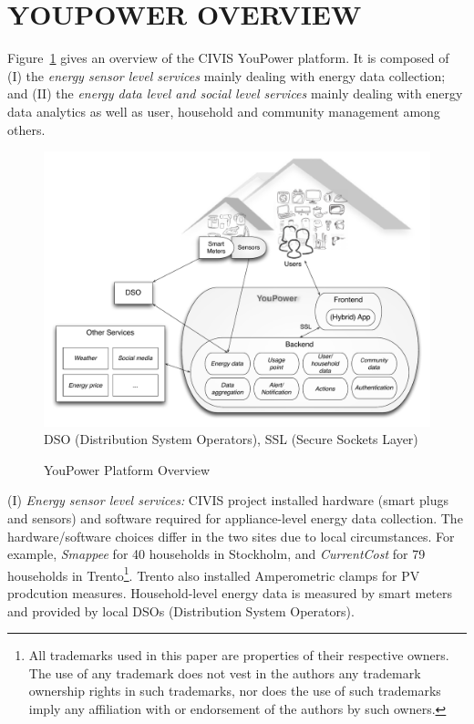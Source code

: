 
\section{\uppercase{YouPower Overview}}
\label{sect:overview}

Figure~\ref{fig:platform} gives an overview of the CIVIS YouPower platform. 
It is composed of (I) the \textit{energy sensor level services} mainly dealing with energy data collection; and (II) the \textit{energy data level and social level services} mainly dealing with energy data analytics as well as user, household and community management among others. 

\begin{figure}[h!]
\begin{center}\footnotesize
	\includegraphics[width=1.0\linewidth]{img/civis_platform_overview.pdf}\\
	DSO (Distribution System Operators),  SSL (Secure Sockets Layer)
	\caption{YouPower Platform Overview}\label{fig:platform}
\end{center}
\end{figure}

(I) \textit{Energy sensor level services:} CIVIS project installed hardware (smart plugs and sensors) and software required for appliance-level energy data collection. The hardware/software choices differ in the two sites due to local circumstances. For example, \textit{Smappee} for 40 households in Stockholm, and \textit{CurrentCost} for 79 households in Trento\footnote{All trademarks used in this paper are properties of their respective owners. The use of any trademark does not vest in the authors any trademark ownership rights in such trademarks, nor does the use of such trademarks imply any affiliation with or endorsement of the authors by such owners.}. Trento also installed Amperometric clamps for PV prodcution measures.
Household-level energy data is measured by smart meters and provided by local DSOs (Distribution System Operators). 

